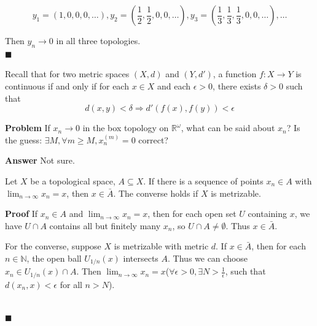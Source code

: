 \documentclass[main.tex]{subfiles}
\begin{document}
\begin{equation}
    y_1 = (1, 0, 0, 0, \ldots), y_2 = (\frac{1}{2}, \frac{1}{2}, 0, 0, \ldots), y_3 = (\frac{1}{3}, \frac{1}{3}, \frac{1}{3}, 0, 0, \ldots), \ldots
\end{equation}
\par Then $y_n \rightarrow 0$ in all three topologies.
\mbox{} \\ \null \hfill $\blacksquare$ 
\par Recall that for two metric spaces $(X, d)$ and $(Y, d')$, a function $f: X \rightarrow Y$ is continuous if and only if for each $x \in X$ and each $\epsilon > 0$, there exists $\delta > 0$ such that
\begin{equation}
    d(x, y) < \delta \Rightarrow d'(f(x), f(y)) < \epsilon
\end{equation}

\par \noindent \textbf{Problem} If $x_n \rightarrow 0$ in the box topology on $\mathbb{R}^{\omega}$, what can be said about $x_n$? Is the guess: $\exists M, \forall m \ge M, x_n^{(m)} = 0$ correct? 
\par \noindent \textbf{Answer} Not sure. 

\begin{theorem}
    Let $X$ be a topological space, $A \subseteq X$. If there is a sequence of points $x_n \in A$ with $\lim_{n \rightarrow \infty} x_n = x$, then $x \in \bar{A}$. The converse holds if $X$ is metrizable.
\end{theorem}

\par \noindent \textbf{Proof} If $x_n \in A$ and $\lim_{n \rightarrow \infty} x_n = x$, then for each open set $U$ containing $x$, we have $U\cap A$ contains all but finitely many $x_n$, so $U \cap A \neq \emptyset$. Thus $x \in \bar{A}$.
\par For the converse, suppose $X$ is metrizable with metric $d$. If $x \in \bar{A}$, then for each $n \in \mathbb{N}$, the open ball $U_{1/n}(x)$ intersects $A$. Thus we can choose $x_n \in U_{1/n}(x) \cap A$. Then $\lim_{n \rightarrow \infty} x_n = x$($\forall \epsilon > 0, \exists N > \frac{1}{\epsilon}$, such that $d(x_n, x) < \epsilon$ for all $n > N$). 

\mbox{} \\ \null \hfill $\blacksquare$ 
\end{document}
